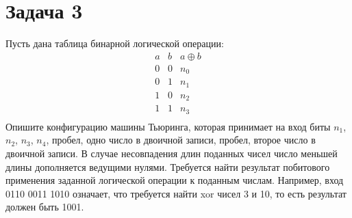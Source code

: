 \section{Задача 3}
Пусть дана таблица бинарной логической операции:
\[
    \begin{array}{ccc}
        a & b & a \oplus b \\ \hline
        0 & 0 & n_0 \\
        0 & 1 & n_1 \\
        1 & 0 & n_2 \\
        1 & 1 & n_3 \\
    \end{array}
\]
Опишите конфигурацию машины Тьюринга,
которая принимает на вход биты $n_1$, $n_2$, $n_3$, $n_4$,
пробел, одно число в двоичной записи,
пробел, второе число в двоичной записи.
В случае несовпадения длин поданных чисел число
меньшей длины дополняется ведущими нулями.
Требуется найти результат побитового применения
заданной логической операции к поданным числам.
Например, вход 0110 0011 1010 означает,
что требуется найти xor чисел 3 и 10,
то есть результат должен быть 1001.
